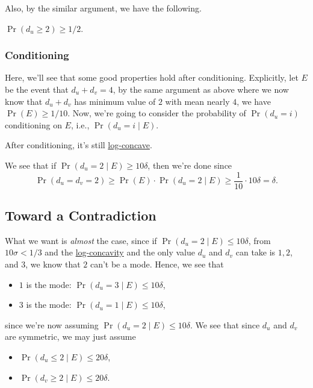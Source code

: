 Also, by the similar argument, we have the following.

\begin{claim}
	\(\Pr(d_u \geq 2) \geq 1 / 2\).
\end{claim}

\subsubsection{Conditioning}\label{subsub:conditioning}
Here, we'll see that some good properties hold after conditioning. Explicitly, let \(E\) be the event that \(d_u + d_v = 4\), by the same argument as above where we now know that \(d_u + d_v\) has minimum value of \(2\) with mean nearly \(4\), we have \(\Pr(E) \geq 1 / 10\). Now, we're going to consider the probability of \(\Pr(d_u = i)\) conditioning on \(E\), i.e., \(\Pr(d_u = i \mid E)\).

\begin{remark}
	After conditioning, it's still \hyperref[def:log-concave]{log-concave}.
\end{remark}

We see that if \(\Pr(d_u = 2 \mid E) \geq 10 \delta\), then we're done since
\[
	\Pr(d_u = d_v = 2) \geq \Pr(E) \cdot \Pr(d_u = 2 \mid E) \geq \frac{1}{10}\cdot 10\delta = \delta.
\]

\subsection{Toward a Contradiction}
What we want is \emph{almost} the case, since if \(\Pr(d_u = 2 \mid E) \leq 10 \delta\), from \(10\sigma < 1 / 3\) and the \hyperref[def:log-concave]{log-concavity} and the only value \(d_u\) and \(d_v\) can take is \(1, 2\), and \(3\), we know that \(2\) can't be a mode. Hence, we see that
\begin{itemize}
	\item \(1\) is the mode: \(\Pr(d_u = 3 \mid E) \leq 10\delta \),
	\item \(3\) is the mode: \(\Pr(d_u = 1 \mid E) \leq 10\delta \),
\end{itemize}
since we're now assuming \(\Pr(d_u = 2 \mid E) \leq 10 \delta \). We see that since \(d_u\) and \(d_v\) are symmetric, we may just assume
\begin{itemize}
	\item \(\Pr(d_u \leq 2 \mid E) \leq 20\delta \),
	\item \(\Pr(d_v \geq 2 \mid E) \leq 20\delta \).
\end{itemize}

